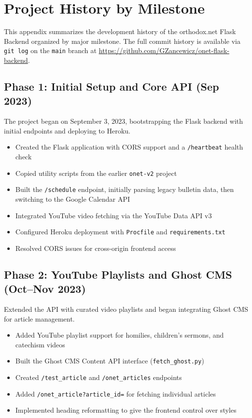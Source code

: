 \documentclass[12pt]{article}
\begin{document}
\clearpage
\appendix
\section{Project History by Milestone}
\label{sec:history}

This appendix summarizes the development history of the orthodox.net Flask Backend organized by major milestone. The full commit history is available via \texttt{git log} on the \texttt{main} branch at \url{https://github.com/GZancewicz/onet-flask-backend}.

\subsection{Phase 1: Initial Setup and Core API (Sep 2023)}

The project began on September 3, 2023, bootstrapping the Flask backend with initial endpoints and deploying to Heroku.

\begin{itemize}
    \item Created the Flask application with CORS support and a \texttt{/heartbeat} health check
    \item Copied utility scripts from the earlier \texttt{onet-v2} project
    \item Built the \texttt{/schedule} endpoint, initially parsing legacy bulletin data, then switching to the Google Calendar API
    \item Integrated YouTube video fetching via the YouTube Data API v3
    \item Configured Heroku deployment with \texttt{Procfile} and \texttt{requirements.txt}
    \item Resolved CORS issues for cross-origin frontend access
\end{itemize}

\subsection{Phase 2: YouTube Playlists and Ghost CMS (Oct--Nov 2023)}

Extended the API with curated video playlists and began integrating Ghost CMS for article management.

\begin{itemize}
    \item Added YouTube playlist support for homilies, children's sermons, and catechism videos
    \item Built the Ghost CMS Content API interface (\texttt{fetch\_ghost.py})
    \item Created \texttt{/test\_article} and \texttt{/onet\_articles} endpoints
    \item Added \texttt{/onet\_article?article\_id=} for fetching individual articles
    \item Implemented heading reformatting to give the frontend control over styles
\end{itemize}
\end{document}
